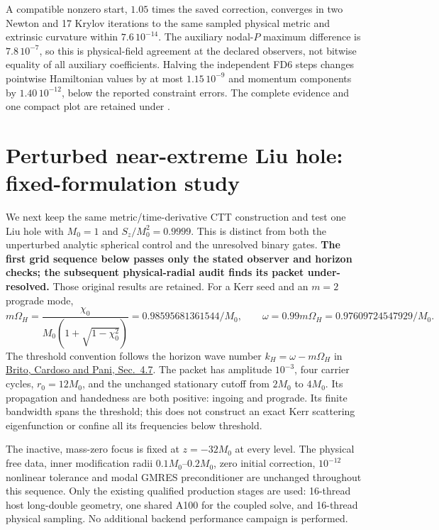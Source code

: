 \documentclass[aps,prd,preprint,notitlepage,nofootinbib]{revtex4-2}
\begin{document}
A compatible nonzero start, $1.05$ times the saved correction, converges
in two Newton and 17 Krylov iterations to the same sampled physical metric
and extrinsic curvature within $7.6\,10^{-14}$. The auxiliary nodal-$P$
maximum difference is $7.8\,10^{-7}$, so this is physical-field agreement at
the declared observers, not bitwise equality of all auxiliary coefficients.
Halving the independent FD6 steps changes pointwise Hamiltonian values by
at most $1.15\,10^{-9}$ and momentum components by $1.40\,10^{-12}$, below
the reported constraint errors. The complete evidence and one compact plot
are retained under .

\section{Perturbed near-extreme Liu hole: fixed-formulation study}
We next keep the same metric/time-derivative CTT construction and test one
Liu hole with $M_0=1$ and $S_z/M_0^2=0.9999$. This is distinct from both
the unperturbed analytic spherical control and the unresolved binary gates.
\textbf{The first grid sequence below passes only the stated observer and
horizon checks; the subsequent physical-radial audit finds its packet
under-resolved.} Those original results are retained.
For a Kerr seed and an $m=2$ prograde mode,
\[
 m\Omega_H=\frac{\chi_0}{M_0(1+\sqrt{1-\chi_0^2})}
 =0.98595681361544/M_0,\qquad
 \omega=0.99m\Omega_H=0.97609724547929/M_0.
\]
The threshold convention follows the horizon wave number
$k_H=\omega-m\Omega_H$ in
\href{https://arxiv.org/html/1501.06570v8#S4.SS7}{Brito, Cardoso and Pani,
Sec.~4.7}. The packet has amplitude $10^{-3}$, four carrier cycles,
$r_0=12M_0$, and the unchanged stationary cutoff from $2M_0$ to $4M_0$.
Its propagation and handedness are both positive: ingoing and prograde.
Its finite bandwidth spans the threshold; this does not construct an exact
Kerr scattering eigenfunction or confine all its frequencies below threshold.

The inactive, mass-zero focus is fixed at $z=-32M_0$ at every level.
The physical free data, inner modification radii $0.1M_0$--$0.2M_0$,
zero initial correction, $10^{-12}$ nonlinear tolerance and modal GMRES
preconditioner are unchanged throughout this sequence. Only the existing
qualified production stages are used: 16-thread host long-double geometry,
one shared A100 for the coupled solve, and 16-thread physical sampling.
No additional backend performance campaign is performed.
\end{document}
